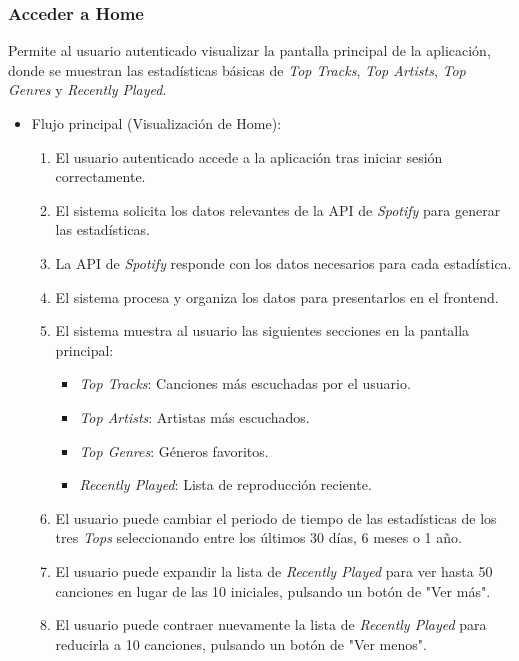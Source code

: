 \subsubsection*{Acceder a Home}

Permite al usuario autenticado visualizar la pantalla principal de la aplicación, donde se muestran las estadísticas básicas de \textit{Top Tracks}, \textit{Top Artists}, \textit{Top Genres} y \textit{Recently Played}.

\begin{itemize}
    \item Flujo principal (Visualización de Home):
          \begin{enumerate}
              \item El usuario autenticado accede a la aplicación tras iniciar sesión correctamente.
              \item El sistema solicita los datos relevantes de la API de \textit{Spotify} para generar las estadísticas.
              \item La API de \textit{Spotify} responde con los datos necesarios para cada estadística.
              \item El sistema procesa y organiza los datos para presentarlos en el frontend.
              \item El sistema muestra al usuario las siguientes secciones en la pantalla principal:
                    \begin{itemize}
                        \item \textit{Top Tracks}: Canciones más escuchadas por el usuario.
                        \item \textit{Top Artists}: Artistas más escuchados.
                        \item \textit{Top Genres}: Géneros favoritos.
                        \item \textit{Recently Played}: Lista de reproducción reciente.
                    \end{itemize}
              \item El usuario puede cambiar el periodo de tiempo de las estadísticas de los tres \textit{Tops} seleccionando entre los últimos 30 días, 6 meses o 1 año.
              \item El usuario puede expandir la lista de \textit{Recently Played} para ver hasta 50 canciones en lugar de las 10 iniciales, pulsando un botón de "Ver más".
              \item El usuario puede contraer nuevamente la lista de \textit{Recently Played} para reducirla a 10 canciones, pulsando un botón de "Ver menos".

\end{enumerate}
\end{itemize}
